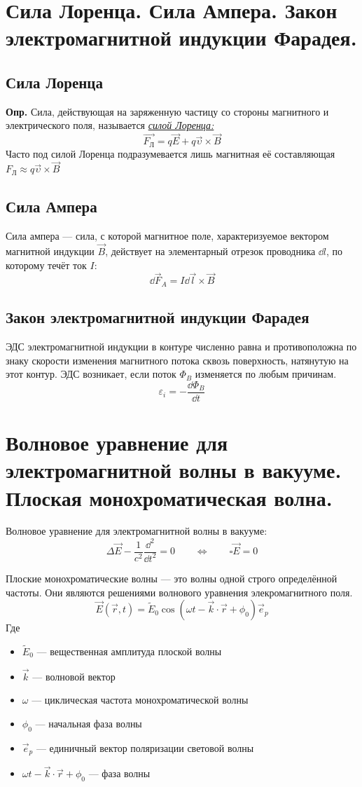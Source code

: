 \documentclass[12pt]{report}
\begin{document}
\section{Сила Лоренца. Сила Ампера. Закон электромагнитной индукции Фарадея.}
\subsection{Сила Лоренца}
\textbf{Опр.} Сила, действующая на заряженную частицу со стороны магнитного и электрического поля, называется \textrm{\underline{\textit{силой Лоренца:}}}
\[
    \vec{F_\textrm{Л}} = q\vec{E} + q\vec{\upsilon}\times\vec{B}
\]
Часто под силой Лоренца подразумевается лишь магнитная её составляющая $F_\textrm{Л} \approx q\vec{\upsilon}\times\vec{B}$

\subsection{Сила Ампера}
Сила ампера --- сила, с которой магнитное поле, характеризуемое вектором магнитной индукции $\vec B$, действует на элементарный отрезок проводника $\dd l$, по которому течёт ток $I$:
\[
    \dd{\vec F_A} = I \dd{\vec{l}} \times \vec{B}
\]

\subsection{Закон электромагнитной индукции Фарадея}
ЭДС электромагнитной индукции в контуре численно равна и противоположна по знаку скорости изменения магнитного потока сквозь поверхность, натянутую на этот контур. ЭДС возникает, если поток $\Phi_B$ изменяется по любым причинам.
\[
    \varepsilon_i = - \dfrac{\dd{\Phi_B}}{\dd t}
\]

\section{Волновое уравнение для электромагнитной волны в вакууме. Плоская монохроматическая волна.}
Волновое уравнение для электромагнитной волны в вакууме:
\[
    \Delta \vec{E} - \dfrac{1}{c^2} \dfrac{\dd^2}{\dd{t^2}} = 0 \qquad \Leftrightarrow \qquad \square \vec E = 0
\]

Плоские монохроматические волны --- это волны одной строго определённой частоты. Они являются решениями волнового уравнения элекромагнитного поля.
\[
    \vec E(\vec r, t) = \widetilde{E}_0\cos(\omega t - \vec{k}\cdot \vec{r} + \phi_0)\vec{e}_p
\]
Где
\begin{itemize}
    \item $\widetilde{E}_0$ --- вещественная амплитуда плоской волны
    \item $\vec{k}$ --- волновой вектор
    \item $\omega$ --- циклическая частота монохроматической волны
    \item $\phi_0$ --- начальная фаза волны
    \item $\vec{e}_p$ --- единичный вектор поляризации световой волны
    \item $\omega t - \vec{k} \cdot \vec{r} + \phi_0$ --- фаза волны
\end{itemize}
\end{document}
